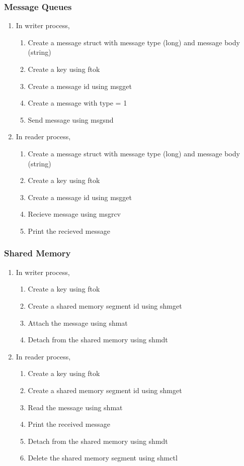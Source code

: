 \subsubsection{Message Queues}
\begin{enumerate}
  \item In writer process,
  \begin{enumerate}
    \item Create a message struct with 
      message type (long) and message body (string)
    \item Create a key using ftok
    \item Create a message id using msgget
    \item Create a message with type = 1
    \item Send message using msgsnd
  \end{enumerate}

  \item In reader process,
  \begin{enumerate}
    \item Create a message struct with 
      message type (long) and message body (string)
    \item Create a key using ftok
    \item Create a message id using msgget
    \item Recieve message using msgrcv
    \item Print the recieved message
  \end{enumerate}
\end{enumerate}

\subsubsection{Shared Memory}
\begin{enumerate}
  \item In writer process, 
  \begin{enumerate}
    \item Create a key using ftok
    \item Create a shared memory segment id using shmget
    \item Attach the message using shmat
    \item Detach from the shared memory using shmdt
  \end{enumerate}
  \item In reader process, 
  \begin{enumerate}
    \item Create a key using ftok
    \item Create a shared memory segment id using shmget
    \item Read the message using shmat
    \item Print the received message
    \item Detach from the shared memory using shmdt
    \item Delete the shared memory segment using shmctl
  \end{enumerate}
\end{enumerate}

